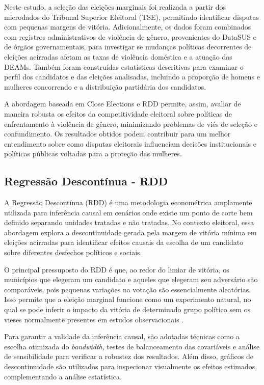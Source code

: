 Neste estudo, a seleção das eleições marginais foi realizada a partir dos microdados do Tribunal Superior Eleitoral (TSE), permitindo identificar disputas com pequenas margens de vitória. Adicionalmente, os dados foram combinados com registros administrativos de violência de gênero, provenientes do DataSUS e de órgãos governamentais, para investigar se mudanças políticas decorrentes de eleições acirradas afetam as taxas de violência doméstica e a atuação das DEAMs. Também foram construídas estatísticas descritivas para examinar o perfil dos candidatos e das eleições analisadas, incluindo a proporção de homens e mulheres concorrendo e a distribuição partidária dos candidatos. 

A abordagem baseada em Close Elections e RDD permite, assim, avaliar de maneira robusta os efeitos da competitividade eleitoral sobre políticas de enfrentamento à violência de gênero, minimizando problemas de viés de seleção e confundimento. Os resultados obtidos podem contribuir para um melhor entendimento sobre como disputas eleitorais influenciam decisões institucionais e políticas públicas voltadas para a proteção das mulheres.

\subsection{Regressão Descontínua - RDD}
\label{rdd}

A Regressão Descontínua (RDD) é uma metodologia econométrica amplamente utilizada para inferência causal em cenários onde existe um ponto de corte bem definido separando unidades tratadas e não tratadas. No contexto eleitoral, essa abordagem explora a descontinuidade gerada pela margem de vitória mínima em eleições acirradas para identificar efeitos causais da escolha de um candidato sobre diferentes desfechos políticos e sociais.

O principal pressuposto do RDD é que, ao redor do limiar de vitória, os municípios que elegeram um candidato e aqueles que elegeram seu adversário são comparáveis, pois pequenas variações na votação são essencialmente aleatórias. Isso permite que a eleição marginal funcione como um experimento natural, no qual se pode inferir o impacto da vitória de determinado grupo político sem os vieses normalmente presentes em estudos observacionais \cite{grimmer2011close}. 

Para garantir a validade da inferência causal, são adotadas técnicas como a escolha otimizada do \textit{bandwidth}, testes de balanceamento das covariáveis e análise de sensibilidade para verificar a robustez dos resultados. Além disso, gráficos de descontinuidade são utilizados para inspecionar visualmente os efeitos estimados, complementando a análise estatística.

